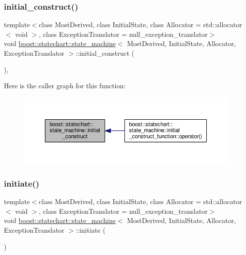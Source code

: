 \subsubsection{\texorpdfstring{initial\+\_\+construct()}{initial\_construct()}}
{\footnotesize\ttfamily template$<$class Most\+Derived, class Initial\+State, class Allocator = std\+::allocator$<$ void $>$, class Exception\+Translator = null\+\_\+exception\+\_\+translator$>$ \\
void \mbox{\hyperlink{classboost_1_1statechart_1_1state__machine}{boost\+::statechart\+::state\+\_\+machine}}$<$ Most\+Derived, Initial\+State, Allocator, Exception\+Translator $>$\+::initial\+\_\+construct (\begin{DoxyParamCaption}{ }\end{DoxyParamCaption})\hspace{0.3cm}{\ttfamily [inline]}, {\ttfamily [private]}}

Here is the caller graph for this function\+:
\nopagebreak
\begin{figure}[H]
\begin{center}
\leavevmode
\includegraphics[width=350pt]{classboost_1_1statechart_1_1state__machine_a858feecd60fbbb1484cc8e01c1e1b5b0_icgraph}
\end{center}
\end{figure}
\mbox{\label{classboost_1_1statechart_1_1state__machine_a7165ce3d1120b98dde6e8d669e35aba9}} 
\subsubsection{\texorpdfstring{initiate()}{initiate()}}
{\footnotesize\ttfamily template$<$class Most\+Derived, class Initial\+State, class Allocator = std\+::allocator$<$ void $>$, class Exception\+Translator = null\+\_\+exception\+\_\+translator$>$ \\
void \mbox{\hyperlink{classboost_1_1statechart_1_1state__machine}{boost\+::statechart\+::state\+\_\+machine}}$<$ Most\+Derived, Initial\+State, Allocator, Exception\+Translator $>$\+::initiate (\begin{DoxyParamCaption}{ }\end{DoxyParamCaption})\hspace{0.3cm}{\ttfamily [inline]}}

